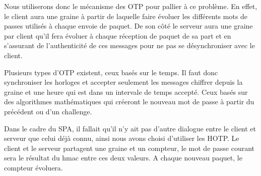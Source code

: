 Nous utiliserons donc le mécanisme des OTP pour pallier à ce problème. En effet, le client aura une graine à partir de laquelle faire évoluer les différents mots de passes utilisés à chaque envoie de paquet. De son côté le serveur aura une graine par client qu'il fera évoluer à chaque réception de paquet de sa part et en s'assurant de l'authenticité de ces messages pour ne pas se désynchroniser avec le client.

Plusieurs types d'OTP existent, ceux basés sur le temps. Il faut donc synchroniser les horloges et accepter seulement les messages chiffrer depuis la graine et une heure qui est dans un intervale de temps accepté.
Ceux basés sur des algorithmes mathématiques qui créeront le nouveau mot de passe à partir du précédent ou d'un challenge.

Dans le cadre du SPA, il fallait qu'il n'y ait pas d'autre dialogue entre le client et serveur que celui déjà connu, ainsi nous avons choisi d'utiliser les HOTP. Le client et le serveur partagent une graine et un compteur, le mot de passe courant sera le résultat du hmac entre ces deux valeurs. A chaque nouveau paquet, le compteur évoluera.
